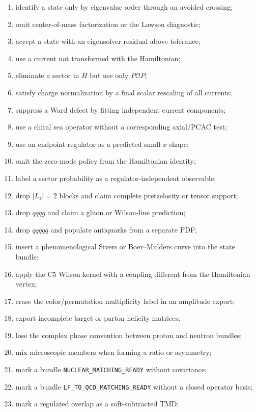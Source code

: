 \documentclass[11pt]{article}
\newcommand{\cO}{\mathcal O}
\newcommand{\Lz}{L_z}
\begin{document}
\begin{enumerate}
 comparison map;
 \item identify a state only by eigenvalue order through an avoided crossing;
 \item omit center-of-mass factorization or the Lawson diagnostic;
 \item accept a state with an eigensolver residual above tolerance;
 \item use a current not transformed with the Hamiltonian;
 \item eliminate a sector in \(H\) but use only \(P\cO P\);
 \item satisfy charge normalization by a final scalar rescaling of all currents;
 \item suppress a Ward defect by fitting independent current components;
 \item use a chiral sea operator without a corresponding axial/PCAC test;
 \item use an endpoint regulator as a predicted small-\(x\) shape;
 \item omit the zero-mode policy from the Hamiltonian identity;
 \item label a sector probability as a regulator-independent observable;
 \item drop \(|\Lz|=2\) blocks and claim complete pretzelosity or tensor support;
 \item drop \(qqqg\) and claim a gluon or Wilson-line prediction;
 \item drop \(qqqq\bar q\) and populate antiquarks from a separate PDF;
 \item insert a phenomenological Sivers or Boer--Mulders curve into the state
 bundle;
 \item apply the C5 Wilson kernel with a coupling different from the Hamiltonian
 vertex;
 \item erase the color/permutation multiplicity label in an amplitude export;
 \item export incomplete target or parton helicity matrices;
 \item lose the complex phase convention between proton and neutron bundles;
 \item mix microscopic members when forming a ratio or asymmetry;
 \item mark a bundle \texttt{NUCLEAR\_MATCHING\_READY} without covariance;
 \item mark a bundle \texttt{LF\_TO\_QCD\_MATCHING\_READY} without a closed
 operator basis;
 \item mark a regulated overlap as a soft-subtracted TMD;

\end{enumerate}
\end{document}
